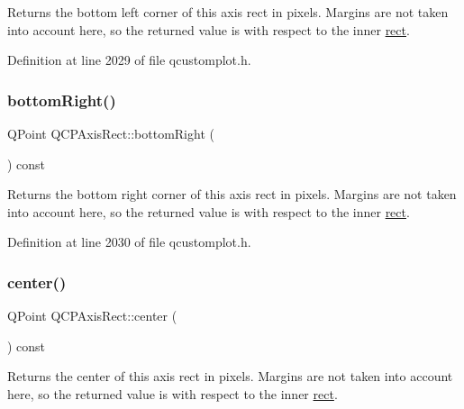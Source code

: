 Returns the bottom left corner of this axis rect in pixels. Margins are not taken into account here, so the returned value is with respect to the inner \hyperlink{class_q_c_p_layout_element_a208effccfe2cca4a0eaf9393e60f2dd4}{rect}. 

Definition at line 2029 of file qcustomplot.\+h.

\mbox{\label{class_q_c_p_axis_rect_a36dac884ec8fa3a3a2f3842ca7b7d32d}} 
\subsubsection{\texorpdfstring{bottom\+Right()}{bottomRight()}}
{\footnotesize\ttfamily Q\+Point Q\+C\+P\+Axis\+Rect\+::bottom\+Right (\begin{DoxyParamCaption}{ }\end{DoxyParamCaption}) const\hspace{0.3cm}{\ttfamily [inline]}}

Returns the bottom right corner of this axis rect in pixels. Margins are not taken into account here, so the returned value is with respect to the inner \hyperlink{class_q_c_p_layout_element_a208effccfe2cca4a0eaf9393e60f2dd4}{rect}. 

Definition at line 2030 of file qcustomplot.\+h.

\mbox{\label{class_q_c_p_axis_rect_ade3aef874bafcec6dd16174fba44c0b1}} 
\subsubsection{\texorpdfstring{center()}{center()}}
{\footnotesize\ttfamily Q\+Point Q\+C\+P\+Axis\+Rect\+::center (\begin{DoxyParamCaption}{ }\end{DoxyParamCaption}) const\hspace{0.3cm}{\ttfamily [inline]}}

Returns the center of this axis rect in pixels. Margins are not taken into account here, so the returned value is with respect to the inner \hyperlink{class_q_c_p_layout_element_a208effccfe2cca4a0eaf9393e60f2dd4}{rect}. 

